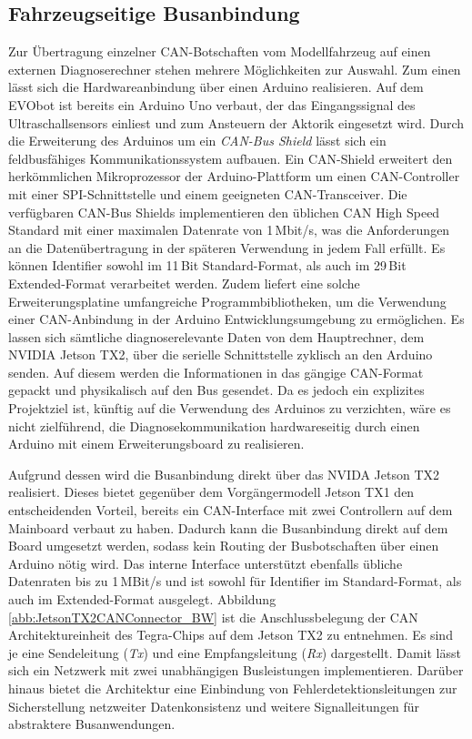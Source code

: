 \subsection{Fahrzeugseitige Busanbindung} \label{subsec:FahrzeugseitigeBusanbindung}
Zur Übertragung einzelner CAN-Botschaften vom Modellfahrzeug auf einen externen Diagnoserechner stehen mehrere Möglichkeiten zur Auswahl. Zum einen lässt sich die Hardwareanbindung über einen Arduino realisieren. Auf dem EVObot ist bereits ein Arduino Uno verbaut, der das Eingangssignal des Ultraschallsensors einliest und zum Ansteuern der Aktorik eingesetzt wird. Durch die Erweiterung des Arduinos um ein \emph{CAN-Bus Shield} lässt sich ein feldbusfähiges Kommunikationssystem aufbauen. Ein CAN-Shield erweitert den herkömmlichen Mikroprozessor der Arduino-Plattform um einen CAN-Controller mit einer SPI-Schnittstelle und einem geeigneten CAN-Transceiver. Die verfügbaren CAN-Bus Shields implementieren den üblichen CAN High Speed Standard mit einer maximalen Datenrate von 1\,Mbit/s, was die Anforderungen an die  Datenübertragung in der späteren Verwendung in jedem Fall erfüllt. Es können Identifier sowohl im 11\,Bit Standard-Format, als auch im 29\,Bit Extended-Format verarbeitet werden. Zudem liefert eine solche Erweiterungsplatine umfangreiche Programmbibliotheken, um die Verwendung einer CAN-Anbindung in der Arduino Entwicklungsumgebung zu ermöglichen. Es lassen sich sämtliche diagnoserelevante Daten von dem Hauptrechner, dem NVIDIA Jetson TX2, über die serielle Schnittstelle zyklisch an den Arduino senden. Auf diesem werden die Informationen in das gängige CAN-Format gepackt und physikalisch auf den Bus gesendet. Da es jedoch ein explizites Projektziel ist, künftig auf die Verwendung des Arduinos zu verzichten, wäre es nicht zielführend, die Diagnosekommunikation hardwareseitig durch einen Arduino mit einem Erweiterungsboard zu realisieren.

Aufgrund dessen wird die Busanbindung direkt über das NVIDA Jetson TX2 realisiert. Dieses bietet gegenüber dem Vorgängermodell Jetson TX1 den entscheidenden Vorteil, bereits ein CAN-Interface mit zwei Controllern auf dem Mainboard verbaut zu haben. Dadurch kann die Busanbindung direkt auf dem Board umgesetzt werden, sodass kein Routing der Busbotschaften über einen Arduino nötig wird. Das interne Interface unterstützt ebenfalls übliche Datenraten bis zu 1\,MBit/s und ist sowohl für Identifier im Standard-Format, als auch im Extended-Format ausgelegt. Abbildung \ref{abb:JetsonTX2CANConnector_BW} ist die Anschlussbelegung der CAN Architektureinheit des Tegra-Chips auf dem Jetson TX2 zu entnehmen. Es sind je eine Sendeleitung (\emph{Tx}) und eine Empfangsleitung (\emph{Rx}) dargestellt. Damit lässt sich ein Netzwerk mit zwei unabhängigen Busleistungen implementieren. Darüber hinaus bietet die Architektur eine Einbindung von Fehlerdetektionsleitungen zur Sicherstellung netzweiter Datenkonsistenz und weitere Signalleitungen für abstraktere Busanwendungen.

